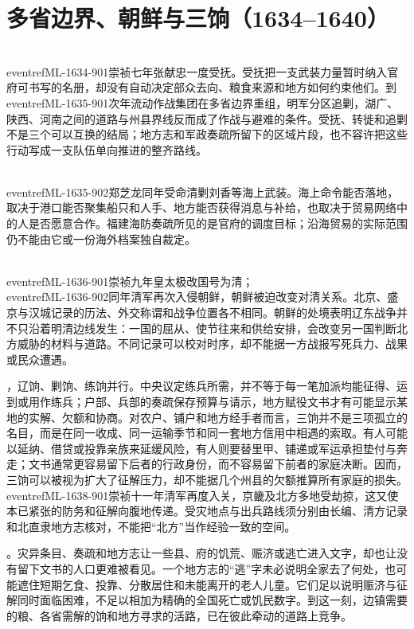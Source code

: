 \section{多省边界、朝鲜与三饷（1634--1640）}

\\eventref{ML-1634-901}{崇祯七年张献忠一度受抚}。受抚把一支武装力量暂时纳入官府可书写的名册，却没有自动决定部众去向、粮食来源和地方如何约束他们。到\\eventref{ML-1635-901}{次年流动作战集团在多省边界重组，明军分区追剿}，湖广、陕西、河南之间的道路与州县界线反而成了作战与避难的条件。受抚、转徙和追剿不是三个可以互换的结局；地方志和军政奏疏所留下的区域片段，也不容许把这些行动写成一支队伍单向推进的整齐路线。

\\eventref{ML-1635-902}{郑芝龙同年受命清剿刘香等海上武装}。海上命令能否落地，取决于港口能否聚集船只和人手、地方能否获得消息与补给，也取决于贸易网络中的人是否愿意合作。福建海防奏疏所见的是官府的调度目标；沿海贸易的实际范围仍不能由它或一份海外档案独自裁定。

\\eventref{ML-1636-901}{崇祯九年皇太极改国号为清}；\\eventref{ML-1636-902}{同年清军再次入侵朝鲜，朝鲜被迫改变对清关系}。北京、盛京与汉城记录的历法、外交称谓和战争位置各不相同。朝鲜的处境表明辽东战争并不只沿着明清边线发生：一国的屈从、使节往来和供给安排，会改变另一国判断北方威胁的材料与道路。不同记录可以校对时序，却不能据一方战报写死兵力、战果或民众遭遇。

，辽饷、剿饷、练饷并行。中央议定练兵所需，并不等于每一笔加派均能征得、运到或用作练兵；户部、兵部的奏疏保存预算与请示，地方赋役文书才有可能显示某地的实解、欠额和协商。对农户、铺户和地方经手者而言，三饷并不是三项孤立的名目，而是在同一收成、同一运输季节和同一套地方信用中相遇的索取。有人可能以延纳、借贷或投靠亲族来延缓风险，有人则要替里甲、铺递或军运承担垫付与奔走；文书通常更容易留下后者的行政身份，而不容易留下前者的家庭决断。因而，三饷可以被视为扩大了征解压力，却不能据几个州县的欠额推算所有家庭的损失。\\eventref{ML-1638-901}{崇祯十一年清军再度入关，京畿及北方多地受劫掠}，这又使本已紧张的防务和征解向腹地传递。受灾地点与出兵路线须分别由长编、清方记录和北直隶地方志核对，不能把“北方”当作经验一致的空间。

。灾异条目、奏疏和地方志让一些县、府的饥荒、赈济或逃亡进入文字，却也让没有留下文书的人口更难被看见。一个地方志的“逃”字未必说明全家去了何处，也可能遮住短期乞食、投靠、分散居住和未能离开的老人儿童。它们足以说明赈济与征解同时面临困难，不足以相加为精确的全国死亡或饥民数字。到这一刻，边镇需要的粮、各省需解的饷和地方寻求的活路，已在彼此牵动的道路上竞争。

